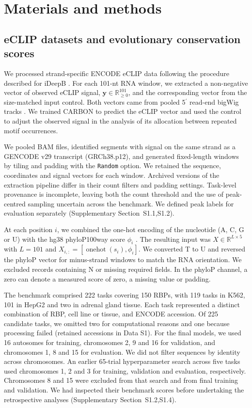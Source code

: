 \documentclass[webpdf,contemporary,large]{current_assets/oup-authoring-template}
\newcommand{\supsect}[1]{Supplementary Section~#1}
\begin{document}
\section{Materials and methods}\label{sec2}

\subsection{eCLIP datasets and evolutionary conservation scores}\label{subsec:data}

We processed strand-specific ENCODE eCLIP data \citep{encode2020expanded} following the procedure described for iDeepB \citep{liu2025ideepb}. For each 101-nt RNA window, we extracted a non-negative vector of observed eCLIP signal, $\mathbf y\in\mathbb R_{\geq0}^{101}$, and the corresponding vector from the size-matched input control. Both vectors came from pooled 5$^\prime$ read-end bigWig tracks \citep{kent2010bigwig}. We trained CARBON to predict the eCLIP vector and used the control to adjust the observed signal in the analysis of its allocation between repeated motif occurrences.

We pooled BAM files, identified segments with signal on the same strand as a GENCODE v29 transcript (GRCh38.p12), and generated fixed-length windows by tiling and padding with the \texttt{Random} option. We retained the sequence, coordinates and signal vectors for each window. Archived versions of the extraction pipeline differ in their count filters and padding settings. Task-level provenance is incomplete, leaving both the count threshold and the use of peak-centred sampling uncertain across the benchmark. We defined peak labels for evaluation separately (\supsect{S1.1,S1.2}).

At each position $i$, we combined the one-hot encoding of the nucleotide (A, C, G or U) with the hg38 phyloP100way score $\phi_i$ \citep{pollard2010phylop}. The resulting input was $X\in\mathbb R^{L\times5}$ with $L=101$ and $X_{i,:}=[\operatorname{onehot}(s_i),\phi_i]$. We converted T to U and reversed the phyloP vector for minus-strand windows to match the RNA orientation. We excluded records containing N or missing required fields. In the phyloP channel, a zero can denote a measured score of zero, a missing value or padding.

The benchmark comprised 222 tasks covering 150 RBPs, with 119 tasks in K562, 101 in HepG2 and two in adrenal gland tissue. Each task represented a distinct combination of RBP, cell line or tissue, and ENCODE accession. Of 225 candidate tasks, we omitted two for computational reasons and one because processing failed (retained accessions in Data S1). For the final models, we used 16 autosomes for training, chromosomes 2, 9 and 16 for validation, and chromosomes 1, 8 and 15 for evaluation. We did not filter sequences by identity across chromosomes. An earlier 65-trial hyperparameter search across five tasks used chromosomes 1, 2 and 3 for training, validation and evaluation, respectively. Chromosomes 8 and 15 were excluded from that search and from final training and validation. We had inspected their benchmark scores before undertaking the retrospective analyses (\supsect{S1.2,S1.4}).
\end{document}
